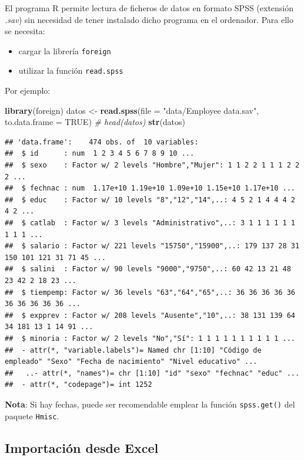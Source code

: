 \documentclass[
]{book}
\newenvironment{Shaded}{\begin{snugshade}}{\end{snugshade}}
\newcommand{\AttributeTok}[1]{\textcolor[rgb]{0.13,0.29,0.53}{#1}}
\newcommand{\CommentTok}[1]{\textcolor[rgb]{0.56,0.35,0.01}{\textit{#1}}}
\newcommand{\ConstantTok}[1]{\textcolor[rgb]{0.56,0.35,0.01}{#1}}
\newcommand{\FunctionTok}[1]{\textcolor[rgb]{0.13,0.29,0.53}{\textbf{#1}}}
\newcommand{\NormalTok}[1]{#1}
\newcommand{\OtherTok}[1]{\textcolor[rgb]{0.56,0.35,0.01}{#1}}
\newcommand{\StringTok}[1]{\textcolor[rgb]{0.31,0.60,0.02}{#1}}
\begin{document}
El programa R permite
lectura de ficheros de datos en formato SPSS (extensión \emph{.sav}) sin
necesidad de tener instalado dicho programa en el ordenador. Para ello
se necesita:

\begin{itemize}
\item
  cargar la librería \texttt{foreign}
\item
  utilizar la función \texttt{read.spss}
\end{itemize}

Por ejemplo:

\begin{Shaded}
\begin{Highlighting}[]
\FunctionTok{library}\NormalTok{(foreign)}
\NormalTok{datos }\OtherTok{\textless{}{-}} \FunctionTok{read.spss}\NormalTok{(}\AttributeTok{file =} \StringTok{"data/Employee data.sav"}\NormalTok{, }\AttributeTok{to.data.frame =} \ConstantTok{TRUE}\NormalTok{)}
\CommentTok{\# head(datos)}
\FunctionTok{str}\NormalTok{(datos)}
\end{Highlighting}
\end{Shaded}

\begin{verbatim}
## 'data.frame':    474 obs. of  10 variables:
##  $ id      : num  1 2 3 4 5 6 7 8 9 10 ...
##  $ sexo    : Factor w/ 2 levels "Hombre","Mujer": 1 1 2 2 1 1 1 2 2 2 ...
##  $ fechnac : num  1.17e+10 1.19e+10 1.09e+10 1.15e+10 1.17e+10 ...
##  $ educ    : Factor w/ 10 levels "8","12","14",..: 4 5 2 1 4 4 4 2 4 2 ...
##  $ catlab  : Factor w/ 3 levels "Administrativo",..: 3 1 1 1 1 1 1 1 1 1 ...
##  $ salario : Factor w/ 221 levels "15750","15900",..: 179 137 28 31 150 101 121 31 71 45 ...
##  $ salini  : Factor w/ 90 levels "9000","9750",..: 60 42 13 21 48 23 42 2 18 23 ...
##  $ tiempemp: Factor w/ 36 levels "63","64","65",..: 36 36 36 36 36 36 36 36 36 36 ...
##  $ expprev : Factor w/ 208 levels "Ausente","10",..: 38 131 139 64 34 181 13 1 14 91 ...
##  $ minoria : Factor w/ 2 levels "No","Sí": 1 1 1 1 1 1 1 1 1 1 ...
##  - attr(*, "variable.labels")= Named chr [1:10] "Código de empleado" "Sexo" "Fecha de nacimiento" "Nivel educativo" ...
##   ..- attr(*, "names")= chr [1:10] "id" "sexo" "fechnac" "educ" ...
##  - attr(*, "codepage")= int 1252
\end{verbatim}

\textbf{Nota}: Si hay fechas, puede ser recomendable emplear la función \texttt{spss.get()} del paquete \texttt{Hmisc}.

\subsection{Importación desde Excel}\label{importaciuxf3n-desde-excel}
\end{document}
